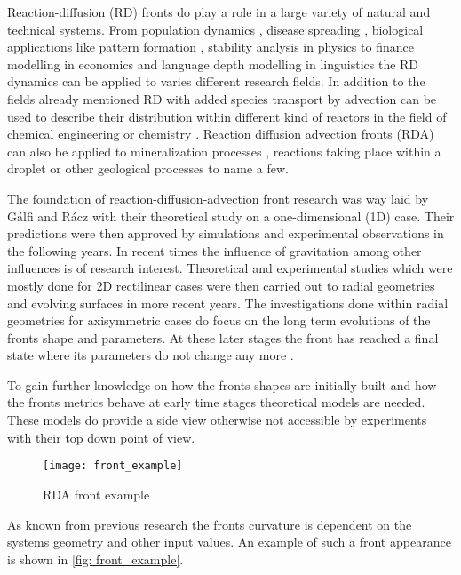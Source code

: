 \documentclass[../thesis.tex]{subfiles}
\begin{document}
Reaction-diffusion (RD) fronts do play a role in a large variety of natural and technical systems. From population dynamics \cite{chen2018hopf, wang2019persistence}, disease spreading \cite{kuto2017concentration, noble1974geographic, may1991infectious}, biological applications like pattern formation \cite{nakagaki1999reaction}, stability analysis in physics \cite{ebert2000front} to finance modelling in economics \cite{mastromatteo2014anomalous} and language depth modelling in linguistics \cite{abrams2003modelling} the RD dynamics can be applied to varies different research fields. In addition to the fields already mentioned RD with added species transport by advection can be used to describe their distribution within different kind of reactors in the field of chemical engineering \cite{brau2020influence} or chemistry \cite{heidel1988pattern, von2013measurement}. Reaction diffusion advection fronts (RDA) can also be applied to mineralization processes \cite{schuszter2016calcium}, reactions taking place within a droplet \cite{tsuji2012chemical} or other geological processes \cite{al2019simulation} to name a few.

The foundation of reaction-diffusion-advection front research was way laid by G\'{a}lfi and R\'{a}cz \cite{galfi1988properties} with their theoretical study on a one-dimensional (1D) case. Their predictions were then approved by simulations \cite{jiang1990simulation} and experimental observations \cite{koo1991space} in the following years. In recent times the influence of gravitation \cite{eckert2012} among other influences is of research interest. Theoretical and experimental studies which were mostly done for 2D rectilinear cases \cite{brau2020influence} were then carried out to radial geometries \cite{toth2020effects, comolli2021dynamics ,stergiou2022effects} and evolving surfaces \cite{kim2020pattern} in more recent years.
The investigations done within radial geometries for axisymmetric cases \cite{toth2020effects, comolli2021dynamics} do focus on the long term evolutions of the fronts shape and parameters. At these later stages the front has reached a final state where its parameters do not change any more \cite{brau2020influence}.

To gain further knowledge on how the fronts shapes are initially built and how the fronts metrics behave at early time stages theoretical models are needed. These models do provide a side view otherwise not accessible by experiments with their top down point of view.
\begin{figure}[htbp]
	\centering
	\texttt{[image: front\_example]}
	\caption{RDA front example}
	\label{fig: front_example}
\end{figure}
As known from previous research the fronts curvature is dependent on the systems geometry and other input values. An example of such a front appearance is shown in \autoref{fig: front_example}.
\end{document}
